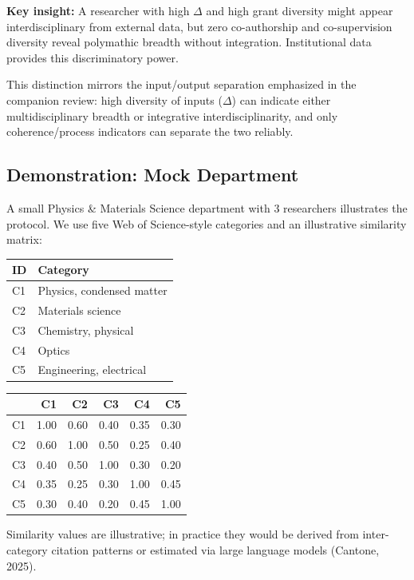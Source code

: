 \documentclass[
]{article}
\begin{document}
\textbf{Key insight:} A researcher with high \(\Delta\) and high grant
diversity might appear interdisciplinary from external data, but zero
co-authorship and co-supervision diversity reveal polymathic breadth
without integration. Institutional data provides this discriminatory
power.

This distinction mirrors the input/output separation emphasized in the
companion review: high diversity of inputs (\(\Delta\)) can indicate
either multidisciplinary breadth or integrative interdisciplinarity, and
only coherence/process indicators can separate the two reliably.

\hypertarget{demonstration-mock-department}{%
\subsection{Demonstration: Mock
Department}\label{demonstration-mock-department}}

A small Physics \& Materials Science department with 3 researchers
illustrates the protocol. We use five Web of Science-style categories
and an illustrative similarity matrix:

\begin{longtable}[]{@{}ll@{}}
\toprule
ID & Category \\
\midrule
\endhead
C1 & Physics, condensed matter \\
C2 & Materials science \\
C3 & Chemistry, physical \\
C4 & Optics \\
C5 & Engineering, electrical \\
\bottomrule
\end{longtable}

\begin{longtable}[]{@{}lrrrrr@{}}
\toprule
& C1 & C2 & C3 & C4 & C5 \\
\midrule
\endhead
C1 & 1.00 & 0.60 & 0.40 & 0.35 & 0.30 \\
C2 & 0.60 & 1.00 & 0.50 & 0.25 & 0.40 \\
C3 & 0.40 & 0.50 & 1.00 & 0.30 & 0.20 \\
C4 & 0.35 & 0.25 & 0.30 & 1.00 & 0.45 \\
C5 & 0.30 & 0.40 & 0.20 & 0.45 & 1.00 \\
\bottomrule
\end{longtable}

Similarity values are illustrative; in practice they would be derived
from inter-category citation patterns or estimated via large language
models (Cantone, 2025).
\end{document}
